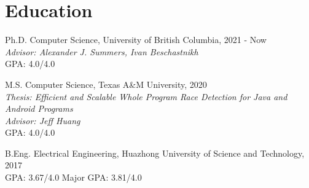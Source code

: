 \documentclass[12pt,letterpaper]{report}
\begin{document}
\section*{Education}

\begin{tablist}

	\item[Ph.D.]  \tab Computer Science, University of British Columbia, 2021 - Now \\
	\textit{Advisor: Alexander J. Summers, Ivan Beschastnikh}\\
	GPA: 4.0/4.0

	\item[M.S.]  \tab Computer Science, Texas A\&M University, 2020 \\
	\textit{Thesis: Efficient and Scalable Whole Program Race Detection for Java and Android Programs}\\
	\textit{Advisor: Jeff Huang}\\
	GPA: 4.0/4.0

	\item[B.Eng.]  \tab Electrical Engineering, Huazhong University of Science and Technology, 2017 \\
	GPA: 3.67/4.0 \hspace{0.5cm} Major GPA: 3.81/4.0

\end{tablist}


\end{document}
